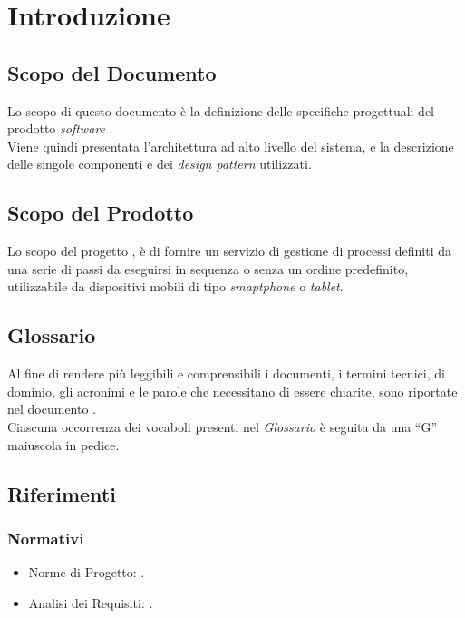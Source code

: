 \section{Introduzione}
\subsection{Scopo del Documento}
Lo scopo di questo documento è la definizione delle specifiche progettuali del prodotto \textit{software} \progetto{}.\\
Viene quindi presentata l'architettura ad alto livello del sistema, e la descrizione delle singole componenti e dei \textit{design pattern} utilizzati.
\subsection{Scopo del Prodotto}
Lo scopo del progetto \progetto{}, è di fornire un servizio di gestione di processi definiti da una serie di passi da eseguirsi in sequenza o senza un ordine predefinito, utilizzabile da dispositivi mobili di tipo \textit{smaptphone} o \textit{tablet}.
\subsection{Glossario}
Al fine di rendere più leggibili e comprensibili i documenti, i termini tecnici, di dominio, gli acronimi e le parole che necessitano di essere chiarite, sono riportate nel documento \Glossario{}.\\
Ciascuna occorrenza dei vocaboli presenti nel \textit{Glossario} è seguita da una ``G'' maiuscola in pedice.
\subsection{Riferimenti}
\subsubsection{Normativi}
\begin{itemize}
\item Norme di Progetto: \NormeDiProgetto{}.
\item Analisi dei Requisiti: \AnalisiDeiRequisiti{}.
\end{itemize}
